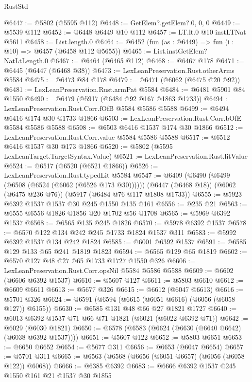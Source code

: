 \begin{lexlean}{RustStd}
\begin{coremodule}
@6447 := @5802 (@5595 @112)
@6448 := GetElem?.getElem?.{0, 0, 0}
@6449 := @5539 @112
@6452 := @6448 @6449 @10 @112
@6457 := LT.lt.{0} @10 instLTNat @5611
@6458 := List.length.{0}
@6464 := @6452 (fun (as : @6449) => fun (i : @10) => @6457 (@6458 @112 @5655))
@6465 := List.instGetElem?NatLtLength.{0}
@6467 := @6464 (@6465 @112)
@6468 := @6467 @178
@6471 := @6445 (@6447 (@6468 @38))
@6473 := LexLeanPreservation.Rust.otherArms @5584
@6475 := @6473 @84 @178
@6479 := @6471 (@6062 (@6475 @20 @92))
@6481 := LexLeanPreservation.Rust.armPat @5584
@6484 := @6481 @5901 @84 @1550
@6490 := @6479 (@5917 (@6484 @92 @167 @1863 @1733))
@6494 := LexLeanPreservation.Rust.Corr.fOfB @5584 @5586 @5588
@6499 := @6494 @6416 @174 @30 @1733 @1866
@6503 := LexLeanPreservation.Rust.Corr.bOfE @5584 @5586 @5588
@6508 := @6503 @6416 @1537 @174 @30 @1866
@6512 := LexLeanPreservation.Rust.Corr.value @5584 @5586 @5588
@6517 := @6512 @6416 @1537 @30 @173 @1866
@6520 := @5802 (@5595 LexLeanTarget.TargetSyntax.Value)
@6521 := LexLeanPreservation.Rust.litValue
@6524 := @6517 (@6520 (@6521 @1866))
@6526 := LexLeanPreservation.Rust.typedLit @5584
@6547 := @6409
    (@6490 (@6499 (@6508 (@6524 (@6062 (@6526 @173 @30))))))
    (@6447 (@6468 @18))
    (@6062 (@6475 @236 @76))
    (@5917 (@6484 @76 @117 @1808 @1733))
@6555 := @5923 @6392 @1537 @1537 @30 @245 @1550 @135 @161
@6556 := @235 @21
@6563 := @6555 @6556 @1826 @1856 @20 @1702 @56 @1708
@6565 := @5969 @6392 @1537
@6568 := @6565 @135 @245 @1826
@6570 := @5978 @6392 @1537
@6578 := @6570 @122 @134 @242 @245 @1733 @1824 @1537 @311
@6583 := @5992 @6392 @1537 @134 @242 @1824
@6585 := @6001 @6392 @1537
@6591 := @6585 @129 @133 @65 @241 @1819 @1823
@6594 := @6565 @129 @65 @1819
@6602 := @6570 @127 @48 @27 @65 @1733 @1727 @1550 @326
@6606 := LexLeanPreservation.Rust.Corr.opsNil @5584 @5586 @5588
@6609 := @6602 (@6606 @6392 @1537)
@6610 := @5607 @127
@6611 := @5803 @6610
@6612 := @6609 @6611
@6613 := @5677 @326
@6615 := @6612 (@6047 @6613)
@6616 := @5701 @326
@6624 := @6591 (@6594 (@6615 (@6051 @6616) (@6056 (@6058 @127)) @6155))
@6630 := @6585 @131 @48 @66 @27 @1821 @1727
@6640 := @6013 @6392 @1537 @71 @66 @71 @1821 (@6021 (@6022 @6392 @71))
@6642 := @6029 (@6030 @1821)
@6650 := @6578 (@6583 (@6624 (@6630 (@6640 @6642) (@6038 @6392 @1537))))
@6651 := @5607 @122
@6652 := @5803 @6651
@6653 := @6650 @6652
@6654 := @5677 @311
@6656 := @6653 (@6047 @6654)
@6657 := @5701 @311
@6665 := @6563 (@6568 (@6656 (@6051 @6657) (@6056 (@6058 @122)) @6068))
@6666 := @6385 @6392
@6683 := @6666
    @6392
    @1537
    @245
    @1550
    @161
    @21
    @1537
    @30
    @1855

\end{coremodule}
\end{lexlean}
